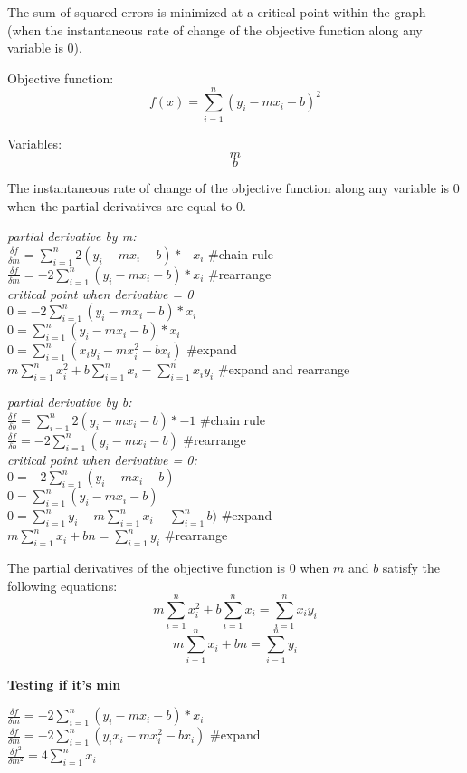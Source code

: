 \documentclass[11pt]{article}
\begin{document}
    The sum of squared errors is minimized at a critical point within the
graph (when the instantaneous rate of change of the objective function
along any variable is 0).

Objective function:\\
\[f(x) = \sum_{i=1}^{n} (y_i − mx_i - b)^2\]

Variables: \[m\] \[b\]

The instantaneous rate of change of the objective function along any
variable is 0 when the partial derivatives are equal to 0.

\emph{partial derivative by m:}\\
\(\frac{\delta f}{\delta m} =\sum_{i=1}^{n} 2(y_i − mx_i - b)*-x_i\)
\#chain rule\\
\(\frac{\delta f}{\delta m} =-2\sum_{i=1}^{n}(y_i − mx_i - b)*x_i\)
\#rearrange\\
\emph{critical point when derivative = 0}\\
\(0 =-2\sum_{i=1}^{n}(y_i − mx_i - b)*x_i\)\\
\(0 =\sum_{i=1}^{n}(y_i − mx_i - b)*x_i\)\\
\(0 =\sum_{i=1}^{n}(x_iy_i − mx_i^2 - bx_i)\) \#expand\\
\(m\sum_{i=1}^{n}x_i^2 + b\sum_{i=1}^{n}x_i = \sum_{i=1}^{n}x_iy_i\)
\#expand and rearrange

\emph{partial derivative by b:}\\
\(\frac{\delta f}{\delta b} = \sum_{i=1}^{n} 2(y_i − mx_i - b)*-1\)
\#chain rule\\
\(\frac{\delta f}{\delta b} = -2\sum_{i=1}^{n}(y_i − mx_i - b)\)
\#rearrange\\
\emph{critical point when derivative = 0:}\\
\(0 = -2\sum_{i=1}^{n}(y_i − mx_i - b)\)\\
\(0 = \sum_{i=1}^{n}(y_i − mx_i - b)\)\\
\(0 = \sum_{i=1}^{n}y_i − m\sum_{i=1}^{n}x_i - \sum_{i=1}^{n}b)\)
\#expand\\
\(m\sum_{i=1}^{n}x_i + bn = \sum_{i=1}^{n}y_i\) \#rearrange

The partial derivatives of the objective function is 0 when \(m\) and
\(b\) satisfy the following equations:\\
\[m\sum_{i=1}^{n}x_i^2 + b\sum_{i=1}^{n}x_i = \sum_{i=1}^{n}x_iy_i\]
\[m\sum_{i=1}^{n}x_i + bn = \sum_{i=1}^{n}y_i\]

    \textbf{Testing if it's min}

\(\frac{\delta f}{\delta m} =-2\sum_{i=1}^{n}(y_i − mx_i - b)*x_i\)\\
\(\frac{\delta f}{\delta m} =-2\sum_{i=1}^{n}(y_ix_i − mx_i^2 - bx_i)\)
\#expand\\
\(\frac{\delta f^2}{\delta m^2} =4\sum_{i=1}^{n}x_i\)
\end{document}
